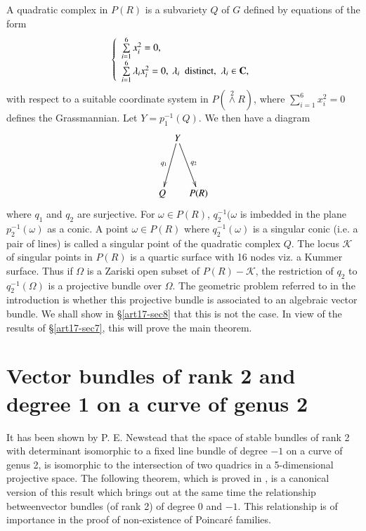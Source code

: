 A quadratic complex in $P(R)$ is a subvariety $Q$ of $G$ defined by equations of the form
$$
\left\{
\begin{array}{l}
\sum\limits^{6}_{i=1}x^{2}_{i}=0,\\[5pt]
\sum\limits^{6}_{i=1}\lambda_{i}x^{2}_{i}=0, \ \lambda_{i}\text{~ distinct,~ } \lambda_{i}\in \mathbf{C},
\end{array}\right.
$$
with respect to a suitable coordinate system in $P({\displaystyle{\mathop{\wedge}\limits^{2}}}R)$, where $\sum\limits^{6}_{i=1}x^{2}_{i}=0$ defines the Grassmannian. Let $Y=p^{-1}_{1}(Q)$. We then have a diagram
\[
\xymatrix@C=.1cm@R=1.5cm{
 & Y\ar[dl]_-{q_{1}}\ar[dr]^-{q_{2}} &\\
Q & & P(R)
}
\]
where $q_{1}$ and $q_{2}$ are surjective. For $\omega \in P(R)$, $q^{-1}_{2}(\omega$ is imbedded in the plane $p^{-1}_{2}(\omega)$ as a conic. A point $\omega\in P(R)$ where $q^{-1}_{2}(\omega)$ is a singular conic (i.e. a pair of lines) is called a singular point of the quadratic complex $Q$. The locus $\mathscr{K}$ of singular points in $P(R)$ is a quartic surface with 16 nodes viz. a Kummer surface. Thus if $\Omega$ is a Zariski open subset of $P(R)-\mathscr{K}$, the restriction of $q_{2}$ to $q^{-1}_{2}(\Omega)$ is a projective bundle over $\Omega$. The geometric problem referred to in the introduction is whether this projective bundle is associated to an algebraic vector bundle. We shall show in \S\ref{art17-sec8} that this is not the case. In view of the results of \S\ref{art17-sec7}, this will prove the main theorem.

\section{Vector bundles of rank 2 and degree 1 on a curve of genus 2}\label{art17-sec6}

It has been shown by P. E. Newstead \cite{art17-key6} that the space of stable bundles of rank 2 with determinant isomorphic to a fixed line bundle of degree $-1$ on a curve of genus 2, is isomorphic to the intersection of two quadrics in a 5-dimensional projective space. The following theorem, which is proved in \cite{art17-key3}, is a canonical version of this result which brings out at the same time the relationship between\pageoriginale vector bundles (of rank 2) of degree $0$ and $-1$. This relationship is of importance in the proof of non-existence of Poincar\'e families.

